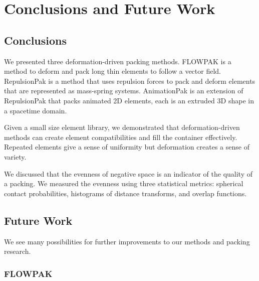
\chapter{Conclusions and Future Work}
\label{chapter_conclusions_and_future_work}

\section{Conclusions}

\newtext
{
We presented three deformation-driven packing methods.
FLOWPAK is a method to deform and pack long thin elements to follow a vector field.
RepulsionPak is a method that uses repulsion forces to pack and deform
elements that are represented as mass-spring systems.
AnimationPak is an extension of RepulsionPak that packs animated 2D elements,
each is an extruded 3D shape in a spacetime domain.
}

\newtext
{
Given a small size element library, 
we demonstrated that deformation-driven methods can create element compatibilities
and fill the container effectively.
Repeated elements give a sense of uniformity but deformation creates a sense of variety.
}

\newtext
{
We discussed that the evenness of negative space is an indicator of the quality of a packing.
We measured the evenness using three statistical metrics:
spherical contact probabilities, histograms of distance transforms, and overlap functions.
}

\section{Future Work}

\newtext
{
We see many possibilities for further improvements to our methods and packing research.
}

\subsection{FLOWPAK}


